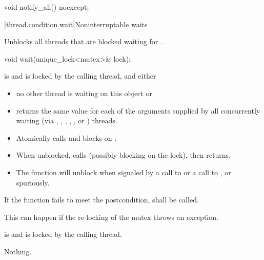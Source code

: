 %
\begin{itemdecl}
void notify_all() noexcept;
\end{itemdecl}


{\color{insertcolor}
[thread.condition.wait]{Noninterruptable waits}
}


\begin{itemdescr}
\pnum\effects Unblocks all threads that are blocked waiting for .
\end{itemdescr}

%
\begin{itemdecl}
void wait(unique_lock<mutex>& lock);
\end{itemdecl}
\begin{itemdescr}
 \pnum \requires {} is  and 
        is locked by the calling thread, and either
        \begin{itemize}
         \item no other thread is waiting on this  object or
         \item {} returns the same value for each of the 
                arguments supplied by all concurrently waiting (via ,
                , ,
                {\color{insertcolor} , , or }) threads.
        \end{itemize}

 \pnum\effects
 \begin{itemize}
        \item Atomically calls  and blocks on .
        \item When unblocked, calls  (possibly blocking on the lock), then returns.
        \item The function will unblock when signaled by a call to 
              or a call to , or spuriously.
 \end{itemize}

 \pnum \remarks
        If the function fails to meet the postcondition, 
        shall be called.
        \begin{note} This can happen if the re-locking of the mutex throws an exception. \end{note}
 
 \pnum \postconditions {} is  and 
        is locked by the calling thread.

 \pnum\throws Nothing.
\end{itemdescr}


